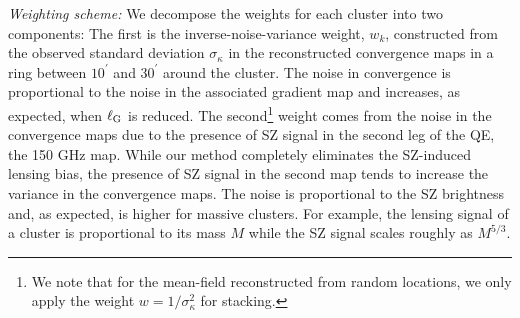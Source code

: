 {\it Weighting scheme:} We decompose the weights for each cluster into two components: 
The first is the inverse-noise-variance weight, $w_{k}$, constructed from the observed standard deviation $\sigma_{\kappa}$ in the reconstructed \sptpol{} convergence maps in a ring between $10^{\prime}$ and $30^{\prime}$ around the cluster. 
The noise in convergence is proportional to the noise in the associated gradient map and increases, as expected, when $\ell_{\rm G}$ is reduced.
The second\footnote{We note that for the mean-field reconstructed from random locations, we only apply the weight $w = 1/\sigma_{\kappa}^2$ for stacking.} weight comes from the noise in the convergence maps due to the presence of SZ signal in the second leg of the QE, the \sptpol{} 150 GHz map.
While our method completely eliminates the SZ-induced lensing bias, the presence of SZ signal in the second map tends to increase the variance in the convergence maps. 
The noise is proportional to the SZ brightness and, as expected, is higher for massive clusters.
For example, the lensing signal of a cluster is proportional to its mass $M$ while the SZ signal scales roughly as $M^{5/3}$.


